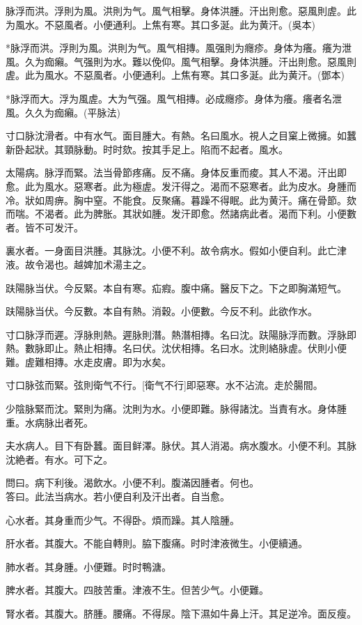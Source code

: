 \documentclass[12pt,twoside,UTF8,b5paper]{ctexbook}
\begin{document}
脉浮而洪。浮則为風。洪則为气。風气相擊。身体洪腫。汗出則愈。惡風則虗。此为風水。不惡風者。小便通利。上焦有寒。其口多涎。此为黄汗。(吳本)

*脉浮而洪。浮則为風。洪則为气。風气相摶。風强則为癮疹。身体为癢。癢为泄風。久为痂癩。气强則为水。難以俛仰。風气相擊。身体洪腫。汗出則愈。惡風則虗。此为風水。不惡風者。小便通利。上焦有寒。其口多涎。此为黄汗。(鄧本)

*脉浮而大。浮为風虗。大为气强。風气相摶。必成癮疹。身体为癢。癢者名泄風。久久为痂癩。(平脉法)

寸口脉沈滑者。中有水气。面目腫大。有熱。名曰風水。視人之目窠上微擁。如蠶新卧起狀。其頸脉動。时时欬。按其手足上。陷而不起者。風水。

太陽病。脉浮而緊。法当骨節疼痛。反不痛。身体反重而痠。其人不渴。汗出即愈。此为風水。惡寒者。此为極虗。发汗得之。渴而不惡寒者。此为皮水。身腫而冷。狀如周痹。胸中窒。不能食。反聚痛。暮躁不得眠。此为黄汗。痛在骨節。欬而喘。不渴者。此为脾胀。其狀如腫。发汗即愈。然諸病此者。渴而下利。小便數者。皆不可发汗。

裏水者。一身面目洪腫。其脉沈。小便不利。故令病水。假如小便自利。此亡津液。故令渴也。越婢加术湯主之。

趺陽脉当伏。今反緊。本自有寒。疝瘕。腹中痛。醫反下之。下之即胸滿短气。

趺陽脉当伏。今反數。本自有熱。消穀。小便數。今反不利。此欲作水。

寸口脉浮而遲。浮脉則熱。遲脉則潛。熱潛相摶。名曰沈。趺陽脉浮而數。浮脉即熱。數脉即止。熱止相摶。名曰伏。沈伏相摶。名曰水。沈則絡脉虗。伏則小便難。虗難相摶。水走皮膚。即为水矣。

寸口脉弦而緊。弦則衛气不行。[衛气不行]即惡寒。水不沾流。走於腸間。

少陰脉緊而沈。緊則为痛。沈則为水。小便即難。脉得諸沈。当責有水。身体腫重。水病脉出者死。

夫水病人。目下有卧蠶。面目鲜澤。脉伏。其人消渴。病水腹水。小便不利。其脉沈絶者。有水。可下之。

問曰。病下利後。渴飲水。小便不利。腹滿因腫者。何也。\\
答曰。此法当病水。若小便自利及汗出者。自当愈。

心水者。其身重而少气。不得卧。煩而躁。其人陰腫。

肝水者。其腹大。不能自轉則。脇下腹痛。时时津液微生。小便續通。

肺水者。其身腫。小便難。时时鴨溏。

脾水者。其腹大。四肢苦重。津液不生。但苦少气。小便難。

腎水者。其腹大。脐腫。腰痛。不得尿。陰下濕如牛鼻上汗。其足逆冷。面反瘦。
\end{document}
